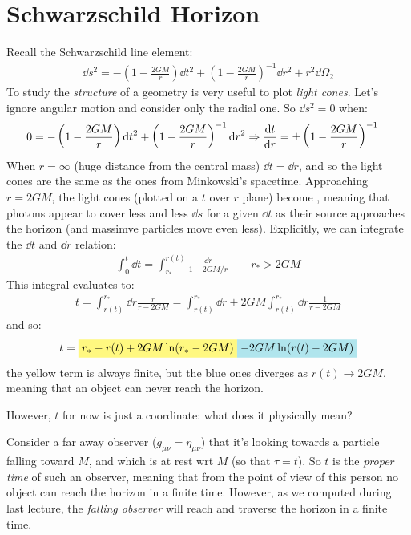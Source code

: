 \documentclass[../template.tex]{subfiles}
\begin{document}
\section{Schwarzschild Horizon}
Recall the Schwarzschild line element:
\begin{align*}
    \dd{s}^2 = -\left(1-\frac{2GM}{r} \right) \dd{t}^2 + \left(1-\frac{2GM}{r} \right)^{-1}\dd{r}^2 + r^2 \dd{\Omega_2}
\end{align*}
To study the \textit{structure} of a geometry is very useful to plot \textit{light cones}. Let's ignore angular motion and consider only the radial one. So $\dd{s}^2 = 0$ when:
\begin{align*}
    0 &= -\left(1-\frac{2GM}{r} \right) \dd{t}^2 + \left(1-\frac{2GM}{r} \right)^{-1} \dd{r}^2 \Rightarrow \dv{t}{r} = \pm \left(1-\frac{2GM}{r} \right)^{-1}
\end{align*}   
When $r = \infty$ (huge distance from the central mass) $\dd{t} = \dd{r}$, and so the light cones are the same as the ones from Minkowski's spacetime. Approaching $r=2GM$, the light cones (plotted on a $t$ over $r$ plane) become , meaning that photons appear to cover less and less $\dd{s}$ for a given $\dd{t}$ as their source approaches the horizon (and massimve particles move even less). Explicitly, we can integrate the $\dd{t}$ and $\dd{r}$ relation:
\begin{align*}
    \int_0^t \dd{t} = \int_{r_*}^{r(t)} \frac{\dd{r}}{1-2GM/r} \qquad r_* > 2GM 
\end{align*}    
This integral evaluates to:
\begin{align*}
    t = \int_{r(t)}^{r_*} \dd{r} \frac{r}{r-2GM} = \int_{r(t)}^{r_*} \dd{r} + 2GM \int_{r(t)}^{r_*} \dd{r} \frac{1}{r- 2GM}  
\end{align*}
and so:
\begin{align*}
    t = \hlc{Yellow}{r_* - r(t) + 2GM \ln(r_* - 2GM)} \hlc{SkyBlue}{- 2GM \ln(r(t)-2GM)}
\end{align*}
the yellow term is always finite, but the blue ones diverges as $r(t) \to 2GM$, meaning that an object can never reach the horizon.

However, $t$ for now is just a coordinate: what does it physically mean?

Consider a far away observer ($g_{\mu \nu }= \eta_{\mu \nu}$) that it's looking towards a particle falling toward $M$, and which is at rest wrt $M$ (so that $\tau = t$). So $t$ is the \textit{proper time} of such an observer, meaning that from the point of view of this person no object can reach the horizon in a finite time. However, as we computed during last lecture, the \textit{falling observer} will reach and traverse the horizon in a finite time.       
\end{document}
